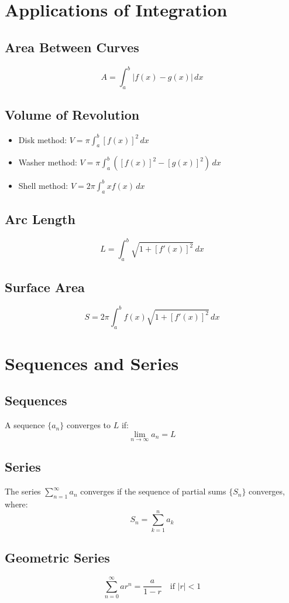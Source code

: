 \documentclass[11pt]{article}
\begin{document}
\section{Applications of Integration}

\subsection{Area Between Curves}
$$A = \int_a^b |f(x) - g(x)| \, dx$$

\subsection{Volume of Revolution}
\begin{itemize}
    \item Disk method: $V = \pi \int_a^b [f(x)]^2 \, dx$
    \item Washer method: $V = \pi \int_a^b ([f(x)]^2 - [g(x)]^2) \, dx$
    \item Shell method: $V = 2\pi \int_a^b x f(x) \, dx$
\end{itemize}

\subsection{Arc Length}
$$L = \int_a^b \sqrt{1 + [f'(x)]^2} \, dx$$

\subsection{Surface Area}
$$S = 2\pi \int_a^b f(x)\sqrt{1 + [f'(x)]^2} \, dx$$

\section{Sequences and Series}

\subsection{Sequences}
A sequence $\{a_n\}$ converges to $L$ if:
$$\lim_{n \to \infty} a_n = L$$

\subsection{Series}
The series $\sum_{n=1}^{\infty} a_n$ converges if the sequence of partial sums $\{S_n\}$ converges, where:
$$S_n = \sum_{k=1}^n a_k$$

\subsection{Geometric Series}
$$\sum_{n=0}^{\infty} ar^n = \frac{a}{1-r} \quad \text{if } |r| < 1$$
\end{document}
